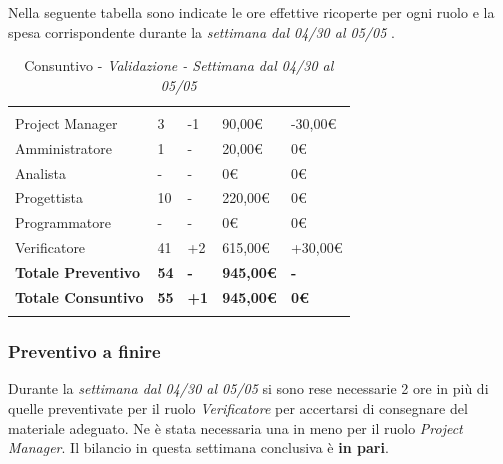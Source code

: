 Nella seguente tabella sono indicate le ore effettive ricoperte per ogni ruolo e la spesa corrispondente durante la \textit{settimana dal 04/30 al 05/05 }.

\label{sec:tabellaConsuntivo2Sett}
\begin{table}[H]
	\centering
	\begin{tabular}{|p{3.8cm}|C{2.6cm}|C{2.9cm}|C{2.7cm}|C{3.3cm}|}
		
		 & & & & \\
		Project Manager & 3 & -1 & 90,00\euro & -30,00\euro \\
		\hline
		Amministratore & 1 & - & 20,00\euro & 0\euro \\
		\hline
		Analista      & - & - & 0\euro & 0\euro \\
		\hline
		Progettista   & 10 & - & 220,00\euro & 0\euro \\
		\hline
		Programmatore & - & - & 0\euro & 0\euro \\
		\hline
		Verificatore  & 41 & +2 & 615,00\euro & +30,00\euro \\
		\textbf{Totale Preventivo} & \textbf{54} & \textbf{-} & \textbf{945,00\euro} & \textbf{-}\\
		\textbf{Totale Consuntivo} & \textbf{55} & \textbf{+1} & \textbf{945,00\euro} & \textbf{0\euro}\\
	\end{tabular}
	\caption{Consuntivo - \textit{Validazione - Settimana dal 04/30 al 05/05 }}
	
\end{table}

\subsubsection{Preventivo a finire}
Durante la  \textit{settimana dal 04/30 al 05/05} si sono rese necessarie 2 ore in più di quelle preventivate per il ruolo \textit{Verificatore} per accertarsi di consegnare del materiale adeguato. Ne è stata necessaria una in meno per il ruolo \textit{Project Manager}. Il bilancio in questa settimana conclusiva è \textbf{in pari}.





